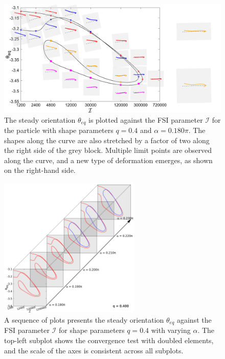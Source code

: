 \documentclass[a4paper,12pt]{report}
\begin{document}
\begin{figure}[!h]
	\begin{center}
		\includegraphics[width=1\textwidth]{plot/RESLT_q_0.40_alpha_0.180pi_plot_step_refine2_new_recale_FSI/combine_elastic_beam_I_theta_q_0.400_alpha_0.180pi_initial_-4.80_refine2_rescale_FSI.png}
        \caption{The steady orientation $\theta_{eq}$ is plotted against the FSI parameter $\mathcal{I}$ for the particle with shape parameters $q = 0.4$ and $\alpha = 0.180\pi$. The shapes along the curve are also stretched by a factor of two along the right side of the grey block. Multiple limit points are observed along the curve, and a new type of deformation emerges, as shown on the right-hand side.}
        \label{fig:8}
	\end{center}
\end{figure}
\begin{figure}[!h]
	\begin{center}
		\includegraphics[width=0.6\textwidth]{plot/RESLT_animation_varying_alpha_q_0.400_step_rescale_FSI/elastic_beam_I_theta_q_0.400_alpha_5.png}
		\caption{A sequence of plots presents the steady orientation $\theta_{eq}$ against the FSI parameter $\mathcal{I}$ for shape parameters $q = 0.4$ with varying $\alpha$. The top-left subplot shows the convergence test with doubled elements, and the scale of the axes is consistent across all subplots.}
		\label{fig:9}
	\end{center}
\end{figure}
\end{document}
